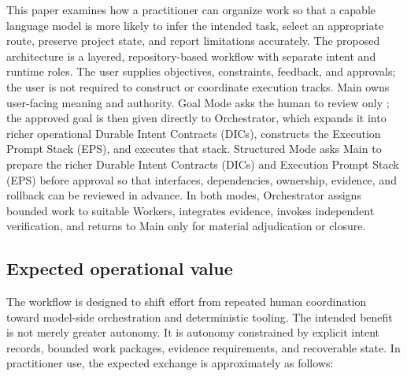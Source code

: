 \documentclass[11pt,a4paper]{article}
\newcommand{\code}[1]{\texttt{\detokenize{#1}}}
\begin{document}
This paper examines how a practitioner can organize work so that a capable language model is more likely to infer the intended task, select an appropriate route, preserve project state, and report limitations accurately. The proposed architecture is a layered, repository-based workflow with separate intent and runtime roles. The user supplies objectives, constraints, feedback, and approvals; the user is not required to construct or coordinate execution tracks. Main owns user-facing meaning and authority. Goal Mode asks the human to review only \code{GOAL.md}; the approved goal is then given directly to Orchestrator, which expands it into richer operational Durable Intent Contracts (DICs), constructs the Execution Prompt Stack (EPS), and executes that stack. Structured Mode asks Main to prepare the richer Durable Intent Contracts (DICs) and Execution Prompt Stack (EPS) before approval so that interfaces, dependencies, ownership, evidence, and rollback can be reviewed in advance. In both modes, Orchestrator assigns bounded work to suitable Workers, integrates evidence, invokes independent verification, and returns to Main only for material adjudication or closure.

\subsection{Expected operational value}\label{sec:operational-value}

The workflow is designed to shift effort from repeated human coordination toward model-side orchestration and deterministic tooling. The intended benefit is not merely greater autonomy. It is autonomy constrained by explicit intent records, bounded work packages, evidence requirements, and recoverable state. In practitioner use, the expected exchange is approximately as follows:
\end{document}
